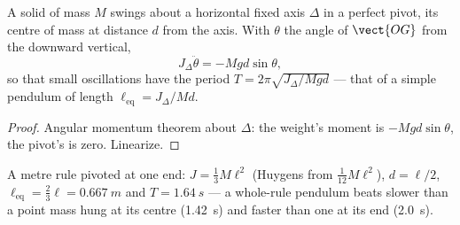 \begin{proposition}\label{prop:b2:rigid-body-mechanics:pendulum}
A solid of mass $M$ swings about a horizontal fixed axis $\Delta$ in a
perfect pivot, its centre of mass at distance $d$ from the axis. With
$\theta$ the angle of $\vect{OG}$ from the downward vertical,
\[
J_\Delta\ddot\theta = -Mgd\sin\theta ,
\]
so that small oscillations have the period $T = 2\pi\sqrt{J_\Delta/Mgd}$
--- that of a simple pendulum of length $\ell_{\text{eq}} = J_\Delta/Md$.
\end{proposition}

\begin{proof}
Angular momentum theorem about $\Delta$: the weight's moment is
$-Mgd\sin\theta$, the pivot's is zero. Linearize.
\end{proof}

\begin{example}\label{ex:b2:rigid-body-mechanics:rule}
A metre rule pivoted at one end: $J = \tfrac13M\ell^2$ (Huygens from
$\tfrac1{12}M\ell^2$), $d = \ell/2$, $\ell_{\text{eq}} = \tfrac23\ell =
\qty{0.667}{m}$ and $T = \qty{1.64}{s}$ --- a whole-rule pendulum beats
slower than a point mass hung at its centre (\qty{1.42}{s}) and faster
than one at its end (\qty{2.0}{s}).
\end{example}

